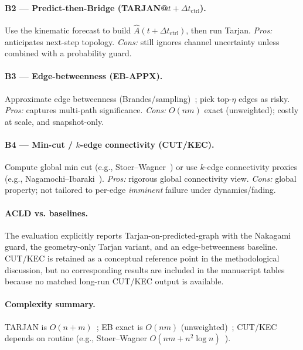\documentclass[preprint,12pt]{elsarticle}
\theoremstyle{definition}\newtheorem{definition}{Definition}
\theoremstyle{plain}\newtheorem{theorem}{Theorem}
\theoremstyle{plain}\newtheorem{lemma}{Lemma}
\theoremstyle{plain}\newtheorem{corollary}{Corollary}
\theoremstyle{plain}\newtheorem{assumption}{Assumption}
\theoremstyle{remark}\newtheorem{remark}[theorem]{Remark}
\begin{document}
\paragraph{B2 — Predict-then-Bridge (TARJAN@\texorpdfstring{$t{+}\Delta t_{\text{ctrl}}$}{t+dt\_ctrl}).} Use the kinematic forecast to build $\widehat{A}(t{+}\Delta t_{\text{ctrl}})$, then run Tarjan. \emph{Pros:} anticipates next-step topology. \emph{Cons:} still ignores channel uncertainty unless combined with a probability guard.

\paragraph{B3 — Edge-betweenness (EB-APPX).} Approximate edge betweenness (Brandes/sampling)~\cite{brandes2001betweenness}; pick top-$\eta$ edges as risky. \emph{Pros:} captures multi-path significance. \emph{Cons:} $O(nm)$ exact (unweighted); costly at scale, and snapshot-only.

\paragraph{B4 — Min-cut / $k$-edge connectivity (CUT/KEC).} Compute global min cut (e.g., Stoer–Wagner~\cite{stoer1997mincut}) or use $k$-edge connectivity proxies (e.g., Nagamochi–Ibaraki~\cite{nagamochi1992edgeconn}). \emph{Pros:} rigorous global connectivity view. \emph{Cons:} global property; not tailored to per-edge \emph{imminent} failure under dynamics/fading.

\paragraph{ACLD vs. baselines.}
The evaluation explicitly reports Tarjan-on-predicted-graph with the Nakagami guard, the geometry-only Tarjan variant, and an edge-betweenness baseline. CUT/KEC is retained as a conceptual reference point in the methodological discussion, but no corresponding results are included in the manuscript tables because no matched long-run CUT/KEC output is available.

\paragraph{Complexity summary.}
TARJAN is $O(n{+}m)$~\cite{tarjan1972dfs}; EB exact is $O(nm)$ (unweighted)~\cite{brandes2001betweenness}; CUT/KEC depends on routine (e.g., Stoer–Wagner $O(nm{+}n^2\log n)$~\cite{stoer1997mincut}).
\end{document}
